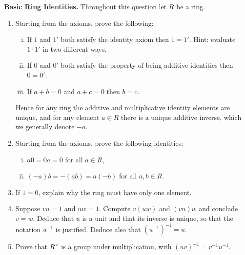 \documentclass[12pt,reqno]{amsart}
\begin{document}
\begin{problems}
\item\label{r:first} \textbf{Basic Ring Identities.} Throughout this question let $R$ be a ring.
\begin{enumerate}
\item Starting from the axioms, prove the following:
\begin{enumerate}[(i)]
\item If $1$ and $1'$ both satisfy the identity axiom then $1=1'$. Hint: evaluate $1\cdot1'$ in two different ways. 
\item If $0$ and $0'$ both satisfy the property of being additive identities then $0=0'$. 
\item If $a+b=0$ and $a+c=0$ then  $b=c$.
\end{enumerate}
Hence for any ring the additive and multiplicative identity elements are unique, and for any element $a\in R$ there is a unique additive inverse, which we generally denote $-a$. 
\item Starting from the axioms, prove the following identities:
\begin{enumerate}[(i)]
\item $a0=0a=0$ for all $a\in R$,
\item  $(-a)b=-(ab)=a(-b)$ for all $a,b\in R$.
\end{enumerate}
\item  If $1=0$, explain why the ring must have only one element.
 \item Suppose $vu=1$ and $uw=1$. Compute $v(uw)$ and $(vu)w$ and conclude $v=w$. Deduce that $u$ is a unit and that its inverse is unique, so that the notation $u^{-1}$ is justified. Deduce also that $(u^{-1})^{-1}=u$.
\item Prove that $R^\times$ is a group under multiplication, with $(uv)^{-1}=v^{-1}u^{-1}$.
\end{enumerate}
\end{problems}
\end{document}

